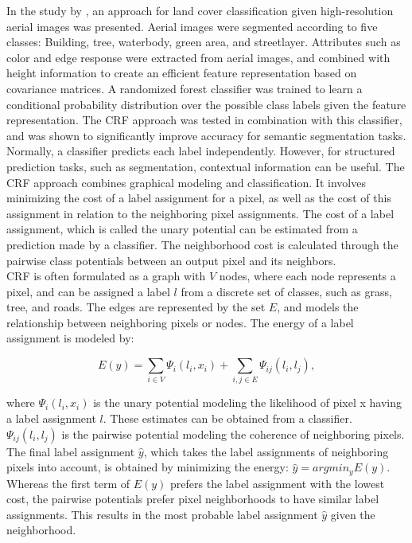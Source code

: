 In the study by \cite{Kluckner_semantic_height}, an approach for land cover classification given high-resolution aerial images was presented. Aerial images were segmented according to five classes: Building, tree, waterbody, green area, and streetlayer. Attributes such as color and edge response were extracted from aerial images, and combined with height information to create an efficient feature representation based on covariance matrices. A randomized forest classifier was trained to learn a conditional probability distribution over the possible class labels given the feature representation. The \ac{CRF} approach was tested in combination with this classifier, and was shown to significantly improve accuracy for semantic segmentation tasks. \\ 

Normally, a classifier predicts each label independently. However, for structured prediction tasks, such as segmentation, contextual information can be useful. The \ac{CRF} approach combines graphical modeling and classification. It involves minimizing the cost of a label assignment for a pixel, as well as the cost of this assignment in relation to the neighboring pixel assignments. The cost of a label assignment, which is called the unary potential can be estimated from a prediction made by a classifier. The neighborhood cost is calculated through the pairwise class potentials between an output pixel and its neighbors.\\

\ac{CRF} is often formulated as a graph with $V$ nodes, where each node represents a pixel, and can be assigned a label $l$ from a discrete set of classes, such as grass, tree, and roads. The edges are represented by the set $E$, and models the relationship between neighboring pixels or nodes. The energy of a label assignment is modeled by:

$$E(y) = \sum\limits_{i\in V} \Psi_i(l_i, x_i) + \sum\limits_{i,j\in E}\Psi_{ij}(l_i, l_j),$$

where $\Psi_i(l_i, x_i)$ is the unary potential modeling the likelihood of pixel x having a label assignment $l$. These estimates can be obtained from a classifier.  $\Psi_{ij}(l_i, l_j)$ is the pairwise potential modeling the coherence of neighboring pixels. The final label assignment $\hat{y}$, which takes the label assignments of neighboring pixels into account, is obtained by minimizing the energy:  $\hat{y} =argmin_y E(y)$. Whereas the first term of $E(y)$ prefers the label assignment with the lowest cost, the pairwise potentials prefer pixel neighborhoods to have similar label assignments. This results in the most probable label assignment $\hat{y}$ given the neighborhood.\\

